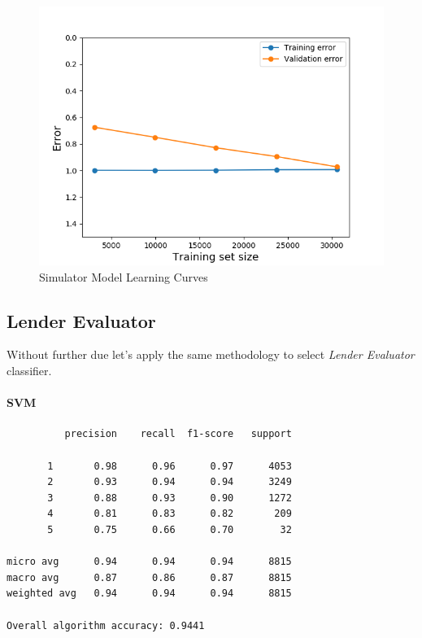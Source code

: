 \begin{Schunk}
\begin{figure}[H]

{\centering \includegraphics[width=1\linewidth]{../../models/training/simulator_rf_tuned_large_curves} 

}

\caption[Simulator Model Learning Curves]{Simulator Model Learning Curves}\label{fig:simulator_lc}
\end{figure}
\end{Schunk}

\hypertarget{lender-evaluator-1}{%
\subsection{Lender Evaluator}\label{lender-evaluator-1}}

Without further due let's apply the same methodology to select
\emph{Lender Evaluator} classifier.

\hypertarget{svm-1}{%
\paragraph{SVM}\label{svm-1}}

\begin{verbatim}
          precision    recall  f1-score   support

       1       0.98      0.96      0.97      4053
       2       0.93      0.94      0.94      3249
       3       0.88      0.93      0.90      1272
       4       0.81      0.83      0.82       209
       5       0.75      0.66      0.70        32

micro avg      0.94      0.94      0.94      8815
macro avg      0.87      0.86      0.87      8815
weighted avg   0.94      0.94      0.94      8815

Overall algorithm accuracy: 0.9441
\end{verbatim}

